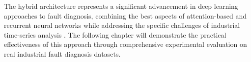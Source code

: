 The hybrid architecture represents a significant advancement in deep learning approaches to fault diagnosis, combining the best aspects of attention-based and recurrent neural networks while addressing the specific challenges of industrial time-series analysis \citep{lei2020applications, zhang2019deep}. The following chapter will demonstrate the practical effectiveness of this approach through comprehensive experimental evaluation on real industrial fault diagnosis datasets.
